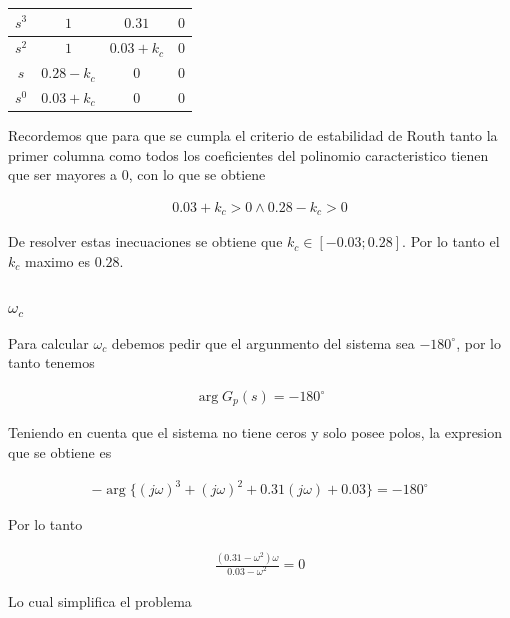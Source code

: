 \documentclass{article}
\begin{document}
    \begin{table}
        \centering
        \begin{tabular}{|c|c|c|c|}
            \hline $s^3$ & $1$ & $0.31$ & $0$ \\
            \hline $s^2$ & $1$ & $0.03 + k_c$ & $0$ \\
            \hline $s$ & $0.28-k_c$ & $0$ & $0$ \\
            \hline $s^0$ & $0.03+k_c$ & $0$ & $0$ \\
            \hline
        \end{tabular}
    \end{table}

    Recordemos que para que se cumpla el criterio de estabilidad de Routh tanto la primer columna como todos los coeficientes del polinomio 
    caracteristico tienen que ser mayores a $0$, con lo que se obtiene 

    \begin{eqnarray}
        0.03 + k_c > 0 \land 0.28 - k_c > 0
    \end{eqnarray}

    De resolver estas inecuaciones se obtiene que $k_c \in [ -0.03 ; 0.28 ]$. Por lo tanto el $k_c$ maximo es $0.28$.

    \subsubsection{$\omega_{c}$}

    Para calcular $\omega_c$ debemos pedir que el argunmento del sistema sea $-180^\circ$, por lo tanto tenemos 

    \begin{eqnarray}
        \arg{ G_p(s) } = -180^\circ
    \end{eqnarray}

    Teniendo en cuenta que el sistema no tiene ceros y solo posee polos, la expresion que se obtiene es 

    \begin{eqnarray}
        -\arg\{ (j\omega)^3 + (j\omega)^2 + 0.31(j\omega) + 0.03  \} = -180^\circ
    \end{eqnarray}

    Por lo tanto 

    \begin{eqnarray}
        \frac{(0.31 - \omega^2)\omega}{0.03 - \omega^2} = 0
    \end{eqnarray}

    Lo cual simplifica el problema 
\end{document}
